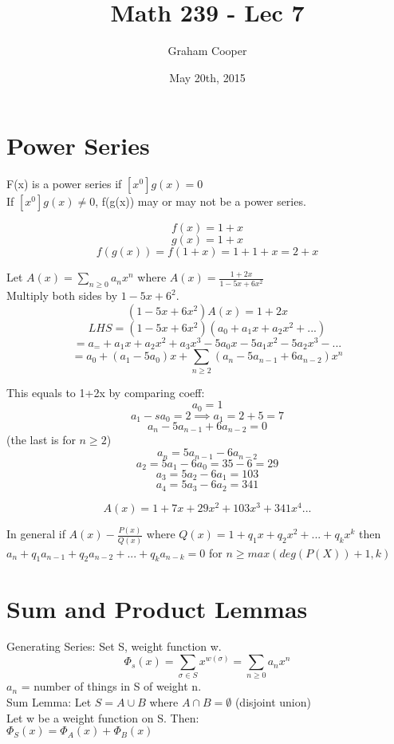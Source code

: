 \documentclass[12pt]{article}
\title{\vspace{-15ex}Math 239 - Lec 7\vspace{-1ex}}
\date{May 20th, 2015}
\author{Graham Cooper}
\begin{document}
	\maketitle
	
	\section*{Power Series}
	F(x) is a power series if $[x^0]g(x) = 0$\\
	If $[x^0]g(x) \neq 0$, f(g(x)) may or may not be a power series.
	
	$$f(x) = 1+x$$
	$$g(x) = 1+x$$
	$$f(g(x)) = f(1+x) = 1+1+x=2+x$$
	
	Let $A(x) = \sum_{n \geq 0}a_nx^n$ where $A(x) = \frac{1+2x}{1-5x+6x^2}$\\
	Multiply both sides by $1-5x+6^2$.
	$$(1-5x+6x^2)A(x) = 1+2x$$
	$$LHS = (1-5x+6x^2)(a_0 + a_1x + a_2x^2 + ...)$$
	$$= a_= + a_1x + a_2x^2 + a_3x^3 - 5a_0x - 5a_1x^2 - 5a_2x^3 - ...$$
	$$= a_0 + (a_1-5a_0)x + \sum_{n \geq 2}(a_n - 5a_{n-1} + 6a_{n-2})x^n$$
	
	This equals to 1+2x by comparing coeff:\\
	$$a_0 = 1$$
	$$a_1 - sa_0 = 2 \implies a_1 = 2+5 = 7$$
	$$a_n-5a_{n-1}+6a_{n-2} = 0$$
	(the last is for $n \geq 2$)\\
	$$a_n = 5a_{n-1} - 6a_{n-2}$$
	$$a_2 = 5a_1 - 6a_0 = 35-6=29$$
	$$a_3 = 5a_2 - 6a_1 = 103$$
	$$a_4 = 5a_3-6a_2 = 341$$
	
	$$A(x) = 1 + 7x + 29x^2 + 103x^3 + 341x^4 ... $$
	
	In general if $A(x) - \frac{P(x)}{Q(x)}$ where $Q(x) = 1 + q_1x + q_2x^2 + ... + q_kx^k$ then $a_n + q_1a_{n-1} + q_2a_{n-2} + ... + q_ka_{n-k}=0$ for $n \geq max(deg(P(X)) + 1, k)$\\
	
	\section*{Sum and Product Lemmas}
	
	Generating Series: Set S, weight function w.\\
	$$\Phi_s(x) = \sum_{\sigma \in S}x^{w(\sigma)} = \sum_{n \geq 0}a_nx^n$$
	$a_n$ = number of things in S of weight n.\\
	
	Sum Lemma: Let $S = A \cup B$ where $A \cap B = \emptyset$ (disjoint union)\\
	Let w be a weight function on S. Then:\\
	$\Phi_S(x) = \Phi_A(x) + \Phi_B(x)$\\
	
\end{document}
